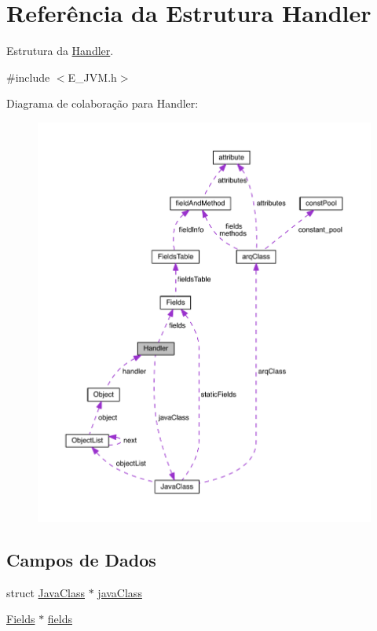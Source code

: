 \hypertarget{struct_handler}{}\section{Referência da Estrutura Handler}
\label{struct_handler}


Estrutura da \hyperlink{struct_handler}{Handler}.  




{\ttfamily \#include $<$E\+\_\+\+J\+V\+M.\+h$>$}



Diagrama de colaboração para Handler\+:
\nopagebreak
\begin{figure}[H]
\begin{center}
\leavevmode
\includegraphics[width=350pt]{struct_handler__coll__graph}
\end{center}
\end{figure}
\subsection*{Campos de Dados}
\begin{DoxyCompactItemize}
\item 
struct \hyperlink{struct_java_class}{Java\+Class} $\ast$ \hyperlink{struct_handler_a0d23c9897e6fa7293405ac2ba8321efb}{java\+Class}
\item 
\hyperlink{struct_fields}{Fields} $\ast$ \hyperlink{struct_handler_ab880a8f45a9b1c69a21372e72f407028}{fields}
\end{DoxyCompactItemize}


